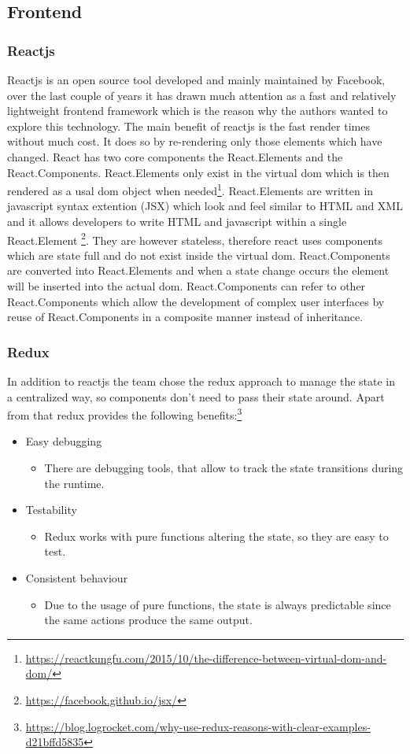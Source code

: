 \subsection{Frontend}
\subsubsection{Reactjs}
Reactjs is an open source tool developed and mainly maintained by Facebook, over the last couple of years it has drawn much attention as a fast and relatively lightweight frontend framework which is the reason why the authors wanted to explore this technology. The main benefit of reactjs  is the fast render times without much cost. It does so by re-rendering only those elements which have changed. React has two core components the React.Elements and the React.Components. React.Elements only exist in the virtual dom which is then rendered as a usal dom object when needed\footnote{\url{https://reactkungfu.com/2015/10/the-difference-between-virtual-dom-and-dom/}}. React.Elements are written in javascript syntax extention (JSX) which look and feel similar to HTML and XML and it allows developers to write HTML and javascript within a single React.Element \footnote{\url{https://facebook.github.io/jsx/}}. They are however stateless, therefore react uses components which are state full and do not exist inside the virtual dom. React.Components are converted into React.Elements and when a state change occurs the element will be inserted into the actual dom. React.Components can refer to other React.Components which allow the development of complex user interfaces by reuse of React.Components in a composite manner instead of inheritance. 

\subsubsection{Redux}
In addition to reactjs the team chose the redux approach to manage the state in a centralized way, so components don’t need to pass their state around. Apart from that redux provides the following benefits:\footnote{\url{https://blog.logrocket.com/why-use-redux-reasons-with-clear-examples-d21bffd5835}}
\begin{itemize}
	\item Easy debugging
	\begin{itemize}
		\item There are debugging tools, that allow to track the state transitions during the runtime.
	\end{itemize}		
	\item Testability
	\begin{itemize}
		\item Redux works with pure functions altering the state, so they are easy to test.
	\end{itemize}
	\item Consistent behaviour
		\begin{itemize}
		\item Due to the usage of pure functions, the state is always predictable since the same actions produce the same output.
	\end{itemize}
\end{itemize}

